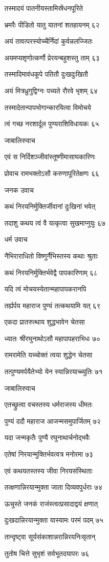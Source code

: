 तस्मादयं पातनीयस्तामिस्रेंधनपूरिते

भ्रमरैः पीडितो यातु यातनां शतहायनम् ६२

अयं तावत्परस्योच्चैर्निंदां कुर्वन्नलज्जितः

अयमप्यशृणोत्कर्णौ प्रेरयन्बहुशस्तु ताम् ६३

तस्मादिमावंधकूपे पतितौ दुःखदुःखितौ

अयं मित्रध्रुगुद्विग्नः पच्यते रौरवे भृशम् ६४

तस्मादेतान्पापभोगान्कारयित्वा विमोचये

त्वं गच्छ नरशार्दूल पुण्यराशिविधायकः ६५

जाबालिरुवाच

एवं स निर्दिशञ्जीवांस्तूष्णीमासाघकारिणः

प्रोवाच रामभक्तोऽसौ करुणापूरितेक्षणः ६६

जनक उवाच

कथं निरयनिर्मुक्तिर्जीवानां दुःखिनां भवेत्

तदाशु कथय त्वं वै यत्कृत्वा सुखमाप्नुयुः ६७

धर्म उवाच

नैभिराराधितो विष्णुर्नैभिस्तस्य कथाः श्रुताः

कथं निरयनिर्मुक्तिर्भवेद्वै पापकारिणाम् ६८

यदि त्वं मोचयस्येतान्महापापकरानपि

तर्ह्यर्पय महाराज पुण्यं तत्कथयामि यत् ६९

एकदा प्रातरुत्थाय शुद्धभावेन चेतसा

ध्यातः श्रीरघुनाथोऽसौ महापापहराभिधः ७०

रामरामेति यच्चोक्तं त्वया शुद्धेन चेतसा

तत्पुण्यमर्पयैतेभ्यो येन स्यान्निरयाच्च्युतिः ७१

जाबालिरुवाच

एतच्छ्रुत्वा वचस्तस्य धर्मराजस्य धीमतः

पुण्यं ददौ महाराज आजन्मसमुपार्जितम् ७२

यदा जन्मकृतैः पुण्यै रघुनाथार्चनोद्भवैः

एतेषां निरयान्मुक्तिर्भवत्वत्र मनोरमा ७३

एवं कथयतस्तस्य जीवा निरयसंस्थिताः

तत्क्षणान्निरयान्मुक्ता जाता दिव्यवपुर्धराः ७४

ऊचुस्ते जनकं राजंस्त्वत्प्रसादाद्वयं क्षणात्

दुःखदान्निरयान्मुक्ता यास्यामः परमं पदम् ७५

तान्दृष्ट्वा सूर्यसंकाशान्नरान्निरयनिःसृतान्

तुतोष चित्ते सुभृशं सर्वभूतदयापरः ७६

